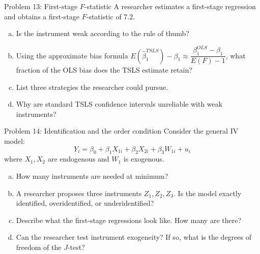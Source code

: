 \documentclass[10pt]{beamer}
\begin{document}
\begin{frame}{Problem 13: First-stage $F$-statistic}
\label{q13}
A researcher estimates a first-stage regression and obtains a first-stage $F$-statistic of 7.2.

\begin{enumerate}[(a)]
  \item Is the instrument weak according to the rule of thumb?
  \item Using the approximate bias formula $E(\widehat{\beta}_1^{TSLS}) - \beta_1 \approx \dfrac{\beta_1^{OLS} - \beta_1}{E(F) - 1}$, what fraction of the OLS bias does the TSLS estimate retain?
  \item List three strategies the researcher could pursue.
  \item Why are standard TSLS confidence intervals unreliable with weak instruments?
\end{enumerate}

\vfill
\hfill\hyperlink{s13}{}
\end{frame}

\begin{frame}{Problem 14: Identification and the order condition}
\label{q14}
Consider the general IV model:
\[
Y_i = \beta_0 + \beta_1 X_{1i} + \beta_2 X_{2i} + \beta_3 W_{1i} + u_i
\]
where $X_1, X_2$ are endogenous and $W_1$ is exogenous.

\begin{enumerate}[(a)]
  \item How many instruments are needed at minimum?
  \item A researcher proposes three instruments $Z_1, Z_2, Z_3$. Is the model exactly identified, overidentified, or underidentified?
  \item Describe what the first-stage regressions look like. How many are there?
  \item Can the researcher test instrument exogeneity? If so, what is the degrees of freedom of the $J$-test?
\end{enumerate}

\vfill
\hfill\hyperlink{s14}{}
\end{frame}
\end{document}
